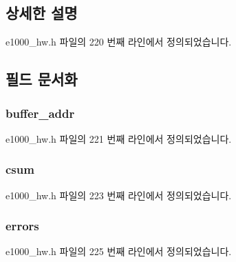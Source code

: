 \subsection{상세한 설명}


e1000\+\_\+hw.\+h 파일의 220 번째 라인에서 정의되었습니다.



\subsection{필드 문서화}
\subsubsection[{\texorpdfstring{buffer\+\_\+addr}{buffer_addr}}]{ buffer\+\_\+addr}\hypertarget{structe1000__rx__desc_a87d79130b57fb21eedf04b9d3945c3d6}{}\label{structe1000__rx__desc_a87d79130b57fb21eedf04b9d3945c3d6}


e1000\+\_\+hw.\+h 파일의 221 번째 라인에서 정의되었습니다.

\subsubsection[{\texorpdfstring{csum}{csum}}]{ csum}\hypertarget{structe1000__rx__desc_ab0c14ac455d34425586c90498f0bd29f}{}\label{structe1000__rx__desc_ab0c14ac455d34425586c90498f0bd29f}


e1000\+\_\+hw.\+h 파일의 223 번째 라인에서 정의되었습니다.

\subsubsection[{\texorpdfstring{errors}{errors}}]{ errors}\hypertarget{structe1000__rx__desc_a766b3bc0bb9fb679f53b877ef8509a4c}{}\label{structe1000__rx__desc_a766b3bc0bb9fb679f53b877ef8509a4c}


e1000\+\_\+hw.\+h 파일의 225 번째 라인에서 정의되었습니다.

